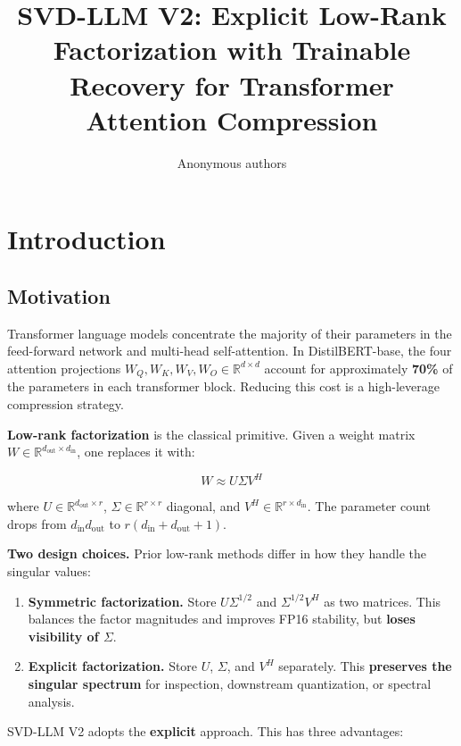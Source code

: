 \title{\textbf{SVD-LLM V2: Explicit Low-Rank Factorization with Trainable Recovery for Transformer Attention Compression}}

\author{Anonymous authors}



\section{Introduction}

\subsection{Motivation}

Transformer language models concentrate the majority of their parameters in 
the feed-forward network and multi-head self-attention. In DistilBERT-base, 
the four attention projections $W_Q, W_K, W_V, W_O \in \mathbb{R}^{d \times d}$ 
account for approximately \textbf{70\%} of the parameters in each transformer 
block. Reducing this cost is a high-leverage compression strategy.

\textbf{Low-rank factorization} is the classical primitive. Given a weight matrix 
$W \in \mathbb{R}^{d_\text{out} \times d_\text{in}}$, one replaces it with:

\[
W \approx U \Sigma V^H
\tag{1.1}
\]

where $U \in \mathbb{R}^{d_\text{out} \times r}$, $\Sigma \in \mathbb{R}^{r \times r}$ 
diagonal, and $V^H \in \mathbb{R}^{r \times d_\text{in}}$. The parameter count 
drops from $d_\text{in} d_\text{out}$ to $r(d_\text{in} + d_\text{out} + 1)$.

\textbf{Two design choices.} Prior low-rank methods differ in how they handle the 
singular values:

\begin{enumerate}
\item \textbf{Symmetric factorization.} Store $U \Sigma^{1/2}$ and $\Sigma^{1/2} V^H$
  as two matrices. This balances the factor magnitudes and improves FP16
  stability, but \textbf{loses visibility of $\Sigma$}.
\item \textbf{Explicit factorization.} Store $U$, $\Sigma$, and $V^H$ separately.
  This \textbf{preserves the singular spectrum} for inspection, downstream
  quantization, or spectral analysis.

\end{enumerate}
SVD-LLM V2 adopts the \textbf{explicit} approach. This has three advantages:

